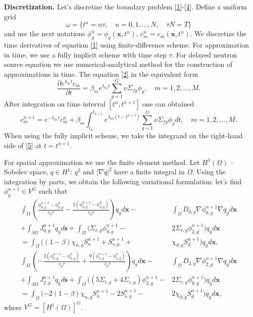 \documentclass[preprint]{elsarticle}
\begin{document}
\textbf{Discretization.}
Let's discretize the boundary problem \eqref{1}-\eqref{4}.
Define a uniform grid
\[
	\omega = \{ t^n=n \tau, \quad n = 0,1,\dots,N, \quad \tau N = T \}
\]
and use the next notations $\phi^n_g = \phi_g(\bm{x}, t^n)$, $c^n_m = c_m(\bm{x}, t^n)$. 
We discretize the time derivatives of equation \eqref{1} using finite-difference scheme. 
For approximation in time, we use a fully implicit scheme with time step $\tau$.
For delayed neutron source equation we use numerical-analytical method for the construction of approximations in time.
The equation \eqref{2} in the equivalent form
\[
	\frac{\partial e^{\lambda_m t} c_m}{\partial t} = 
	\beta_m e^{\lambda_m t} \sum_{g=1}^{G} \nu \Sigma_{fg} \phi_g, \quad m = 1,2,\dots,M.
\]
After integration on time interval $[t^n, t^{n+1}]$ one can obtained
\begin{equation}\label{5}
	c_m^{n+1} = e^{-\lambda_m\tau} c_m^n + 
	\beta_m \int_{t_n}^{t_{n+1}} e^{\lambda_m (t - t^{n+1})} \sum_{g=1}^{G} \nu \Sigma_{fg} \phi_g d t,
	\quad m = 1,2,\dots,M.
\end{equation}
When using the fully implicit scheme, we take the integrand on the right-hand side of \eqref{5} at $t = t^{n + 1}$.

For spatial approximation we use the finite element method.
Let $H^1(\Omega)$ -- Sobolev space, $q \in H^1$: $q^2$ and $\vert\nabla q\vert^2$ have a finite integral in $\Omega$. 
Using the integration by parts, we obtain the following variational formulation: let's find $\phi^{n+1}_g \in V^G$ such that
\begin{equation}\label{6}
\begin{split}
	\int_{\Omega} 
		\left( 
			\frac{\phi^{n+1}_{0,g} - \phi^{n}_{0,g}}{v_g \tau} -
			\frac{2(\phi^{n+1}_{2,g} - \phi^{n}_{2,g})}{v_g \tau} 
		\right) q_g d\bm{x} - & %
	\int_{\Omega} D_{0,g} \nabla \phi^{n+1}_{0,g} \nabla q_g d\bm{x} \\
	+ \int_{\partial\Omega} J^{n+1}_{0,g} q_g d\bm{s} +
	\int_{\Omega}
		(
			\Sigma_{r,g} \phi^{n+1}_{0,g} - & %
			2\Sigma_{r,g} \phi^{n+1}_{2,g} 
		) q_g d\bm{x} \\
	= \int_{\Omega} 
		(
			(1 - \beta) \chi_{n,g} S^{n+1}_{n} + 
			 S^{n+1}_{s,g} + & %
			 \chi_{d,g} S^{n+1}_d 
		) q_g d\bm{x}, \\
	\int_{\Omega} 
		\left( 
			- \frac{2(\phi^{n+1}_{0,g} - \phi^{n}_{0,g})}{v_g \tau} + 
			\frac{9(\phi^{n+1}_{2,g} - \phi^{n}_{2,g})}{v_g \tau} 
		\right) q_g d\bm{x} - & %
	\int_{\Omega} D_{2,g} \nabla \phi^{n+1}_{2,g} \nabla  q_g d\bm{x} \\
	+ \int_{\partial\Omega} J^{n+1}_{2,g} q_g d\bm{s} + 
	\int_{\Omega} 
		( 
			(5 \Sigma_{t,g} + 
			4 \Sigma_{r,g}) \phi^{n+1}_{2,g} - & %
			2\Sigma_{r,g} \phi^{n+1}_{0,g} 
		) q_g d\bm{x} \\
	= \int_{\Omega}
		( 
			- 2(1 - \beta) \chi_{n,g} S^{n+1}_{n} - 
			2S^{n+1}_{s,g} - & %
			2\chi_{d,g} S^{n+1}_d 
		) q_g d\bm{x},
\end{split}
\end{equation}
where $V^G=[H^1(\Omega)]^G$.
\end{document}
